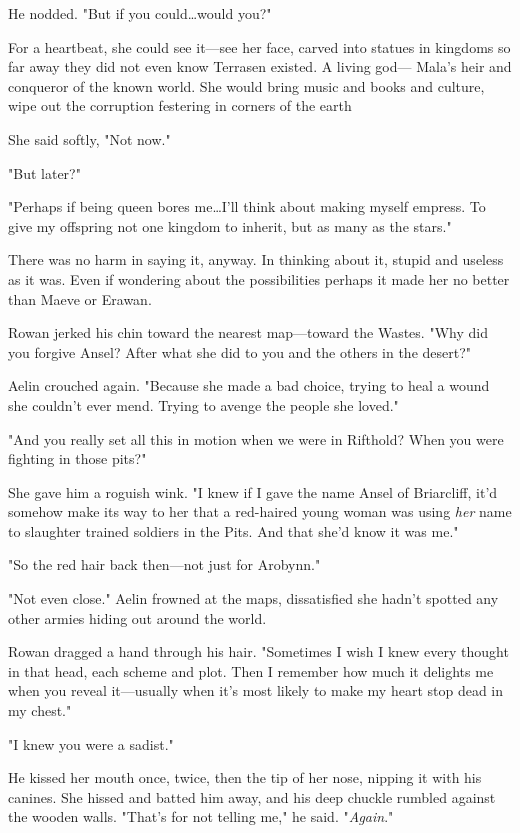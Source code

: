 He nodded.
"But if you could\ldots would you?"

For a heartbeat, she could see it---see her face, carved into statues in kingdoms so far away they did not even know Terrasen existed.
A living god--- Mala's heir and conqueror of the known world.
She would bring music and books and culture, wipe out the corruption festering in corners of the earth 

She said softly, "Not now."

"But later?"

"Perhaps if being queen bores me\ldots I'll think about making myself empress.
To give my offspring not one kingdom to inherit, but as many as the stars."

There was no harm in saying it, anyway.
In thinking about it, stupid and useless as it was.
Even if wondering about the possibilities 
perhaps it made her no better than Maeve or Erawan.

Rowan jerked his chin toward the nearest map---toward the Wastes.
"Why did you forgive Ansel?
After what she did to you and the others in the desert?"

Aelin crouched again.
"Because she made a bad choice, trying to heal a wound she couldn't ever mend.
Trying to avenge the people she loved."

"And you really set all this in motion when we were in Rifthold?
When you were fighting in those pits?"

She gave him a roguish wink.
"I knew if I gave the name Ansel of Briarcliff, it'd somehow make its way to her that a red-haired young woman was using \emph{her} name to slaughter trained soldiers in the Pits.
And that she'd know it was me."

"So the red hair back then---not just for Arobynn."

"Not even close."
Aelin frowned at the maps, dissatisfied she hadn't spotted any other armies hiding out around the world.

Rowan dragged a hand through his hair.
"Sometimes I wish I knew every thought in that head, each scheme and plot.
Then I remember how much it delights me when you reveal it---usually when it's most likely to make my heart stop dead in my chest."

"I knew you were a sadist."

He kissed her mouth once, twice, then the tip of her nose, nipping it with his canines.
She hissed and batted him away, and his deep chuckle rumbled against the wooden walls.
"That's for not telling me," he said.
"\emph{Again}."

